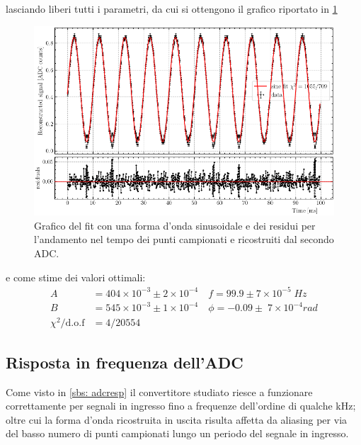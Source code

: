 \documentclass[10pt, a4paper, italian]{article}
\begin{document}
lasciando liberi tutti i parametri, da cui si ottengono il grafico riportato 
in \cref{fig: sinfit}
\begin{figure}[htbp]
    \centering
	\includegraphics[width=\textwidth]{sinfit}
    \caption{Grafico del fit con una forma d'onda sinusoidale e dei residui
    per l'andamento nel tempo dei punti campionati e ricostruiti dal secondo ADC.
    \label{fig: sinfit}}
\end{figure}
e come stime dei valori ottimali:
\begin{align*}
A &= 404 \times 10^{-3} \pm 2 \times 10^{-4} \quad f = 99.9\pm 7 \times 10^{-5}\; \si{Hz} \\
B &= 545 \times 10^{-3} \pm 1 \times 10^{-4} \quad \phi = -0.09 \pm \; 7 \times 10^{-4}\si{rad} \\
\chi^2/\text{d.o.f} &=  4 / 20554
\end{align*}

\subsection{Risposta in frequenza dell'ADC}
\label{sbs: freq}
Come visto in \cref{sbs: adcresp} il convertitore studiato riesce a funzionare
correttamente per segnali in ingresso fino a frequenze dell'ordine di qualche
kHz; oltre cui la forma d'onda ricostruita in uscita risulta affetta da
aliasing per via del basso numero di punti campionati lungo un periodo del
segnale in ingresso.
\end{document}
